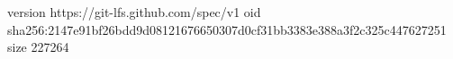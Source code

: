 version https://git-lfs.github.com/spec/v1
oid sha256:2147e91bf26bdd9d08121676650307d0cf31bb3383e388a3f2c325c447627251
size 227264
